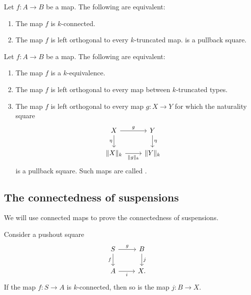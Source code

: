 \begin{thm}
Let $f:A\to B$ be a map. The following are equivalent:
\begin{enumerate}
\item The map $f$ is $k$-connected.
\item The map $f$ is left orthogonal to every $k$-truncated map.
is a pullback square.
\end{enumerate}
\end{thm}

\begin{thm}
  Let $f:A\to B$ be a map. The following are equivalent:
  \begin{enumerate}
  \item The map $f$ is a $k$-equivalence.
  \item The map $f$ is left orthogonal to every map between $k$-truncated types.
  \item The map $f$ is left orthogonal to every map $g:X\to Y$ for which the naturality square
    \begin{equation*}
      \begin{tikzcd}
        X \arrow[r,"g"] \arrow[d,swap,"\eta"] & Y \arrow[d,"\eta"] \\
        \trunc{k}{X} \arrow[r,swap,"\trunc{k}{g}"] & \trunc{k}{Y}
      \end{tikzcd}
    \end{equation*}
    is a pullback square. Such maps are called .
  \end{enumerate}
\end{thm}

\subsection{The connectedness of suspensions}

We will use connected maps to prove the connectedness of suspensions.

\begin{prp}\label{prp:conn-pushout}
  Consider a pushout square
  \begin{equation*}
    \begin{tikzcd}
      S \arrow[d,swap,"f"] \arrow[r,"g"] & B \arrow[d,"j"] \\
      A \arrow[r,swap,"i"] & X.
    \end{tikzcd}
  \end{equation*}
  If the map $f:S\to A$ is $k$-connected, then so is the map $j:B\to X$.
\end{prp}

